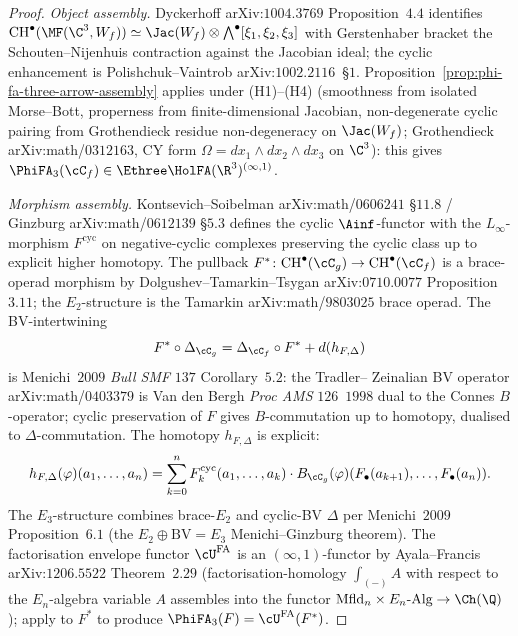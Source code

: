 \begin{proof}
\emph{Object assembly.} Dyckerhoff arXiv:$1004.3769$ Proposition~$4.4$
identifies $\mathrm{CH}^\bullet(\MF(\C^3, W_f)) \simeq \Jac(W_f) \otimes
\bigwedge^\bullet[\xi_1, \xi_2, \xi_3]$ with Gerstenhaber bracket the
Schouten--Nijenhuis contraction against the Jacobian ideal; the cyclic
enhancement is Polishchuk--Vaintrob arXiv:$1002.2116$~\S$1$.
Proposition~\ref{prop:phi-fa-three-arrow-assembly} applies under
\textup{(H1)}--\textup{(H4)} (smoothness from isolated Morse--Bott,
properness from finite-dimensional Jacobian, non-degenerate cyclic
pairing from Grothendieck residue non-degeneracy on
$\Jac(W_f)$; Grothendieck arXiv:math/$0312163$, CY form
$\Omega = dx_1 \wedge dx_2 \wedge dx_3$ on $\C^3$): this gives
$\PhiFA_3(\cC_f) \in \Ethree\HolFA(\R^3)^{(\infty,1)}$.

\emph{Morphism assembly.} Kontsevich--Soibelman arXiv:math/$0606241$
\S$11.8$ / Ginzburg arXiv:math/$0612139$ \S$5.3$ defines the cyclic
$\Ainf$-functor with the $L_\infty$-morphism $F^{\mathrm{cyc}}$ on
negative-cyclic complexes preserving the cyclic class up to explicit
higher homotopy. The pullback $F^* \colon \mathrm{CH}^\bullet(\cC_g)
\to \mathrm{CH}^\bullet(\cC_f)$ is a brace-operad morphism by
Dolgushev--Tamarkin--Tsygan arXiv:$0710.0077$ Proposition~$3.11$; the
$E_2$-structure is the Tamarkin arXiv:math/$9803025$ brace operad. The
BV-intertwining
\[
 F^* \circ \Delta_{\cC_g} = \Delta_{\cC_f} \circ F^* + d(h_{F, \Delta})
\]
is Menichi~$2009$ \textit{Bull SMF} $137$ Corollary~$5.2$: the Tradler--
Zeinalian BV operator arXiv:math/$0403379$ is Van den Bergh
\textit{Proc AMS} $126$~$1998$ dual to the Connes $B$-operator; cyclic
preservation of $F$ gives $B$-commutation up to homotopy, dualised to
$\Delta$-commutation. The homotopy $h_{F, \Delta}$ is explicit:
\[
 h_{F, \Delta}(\varphi)(a_1, \ldots, a_n)
 = \sum_{k=0}^{n}
 F_k^{\mathrm{cyc}}(a_1, \ldots, a_k) \cdot
 B_{\cC_g}(\varphi)(F_\bullet(a_{k+1}), \ldots, F_\bullet(a_n)).
\]
The $E_3$-structure combines brace-$E_2$ and cyclic-BV $\Delta$ per
Menichi~$2009$ Proposition~$6.1$ (the $E_2 \oplus \mathrm{BV} = E_3$
Menichi--Ginzburg theorem). The factorisation envelope functor
$\cU^{\mathrm{FA}}$ is an $(\infty,1)$-functor by Ayala--Francis
arXiv:$1206.5522$ Theorem~$2.29$ (factorisation-homology
$\int_{(-)} A$ with respect to the $E_n$-algebra variable $A$
assembles into the functor $\mathrm{Mfld}_n \times E_n\text{-Alg} \to
\Ch(\Q)$); apply to $F^*$ to produce
$\PhiFA_3(F) = \cU^{\mathrm{FA}}(F^*)$.


\end{proof}
